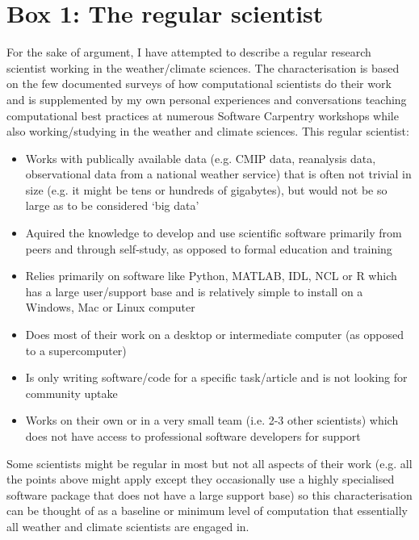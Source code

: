 \section*{Box 1: The regular scientist}

For the sake of argument, I have attempted to describe a regular research scientist working in the weather/climate sciences. The characterisation is based on the few documented surveys of how computational scientists do their work \citep{Hannay2009,Stodden2010} and is supplemented by my own personal experiences and conversations teaching computational best practices at numerous Software Carpentry workshops while also working/studying in the weather and climate sciences. This regular scientist:
\begin{itemize}
\item Works with publically available data (e.g. CMIP data, reanalysis data, observational data from a national weather service) that is often not trivial in size (e.g. it might be tens or hundreds of gigabytes), but would not be so large as to be considered `big data' 
\item Aquired the knowledge to develop and use scientific software primarily from peers and through self-study, as opposed to formal education and training
\item Relies primarily on software like Python, MATLAB, IDL, NCL or R which has a large user/support base and is relatively simple to install on a Windows, Mac or Linux computer
\item Does most of their work on a desktop or intermediate computer (as opposed to a supercomputer)
\item Is only writing software/code for a specific task/article and is not looking for community uptake \citep{Easterbrook2014} 
\item Works on their own or in a very small team (i.e. 2-3 other scientists) which does not have access to professional software developers for support
\end{itemize}

Some scientists might be regular in most but not all aspects of their work (e.g. all the points above might apply except they occasionally use a highly specialised software package that does not have a large support base) so this characterisation can be thought of as a baseline or minimum level of computation that essentially all weather and climate scientists are engaged in.  






